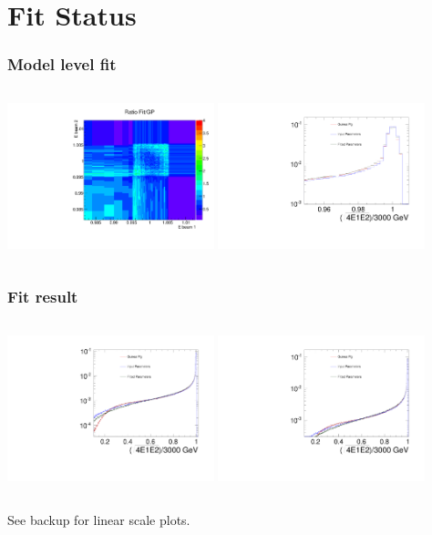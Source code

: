 \documentclass{beamer}
\begin{document}
\section{Fit Status}
\begin{frame}
\frametitle{Model level fit}
\begin{columns}[c]
\column{6cm}
\includegraphics[width=6cm]{Ratio_Fit_vs_GP_FCAL.pdf}
\column{6cm}
\includegraphics[width=6cm]{FullSpectrumFCAL_zoom.pdf}
\end{columns}
\end{frame}

\begin{frame}
\frametitle{Fit result}\label{slide:fitres}
\begin{columns}[c]
\column{6cm}
\includegraphics[width=6cm,page=1]{FullSpectrumFCAL.pdf}
\column{6cm}
\includegraphics[width=6cm,page=3]{res_FCAL.pdf}
\end{columns}
See backup for linear scale plots.
\end{frame}
\end{document}
